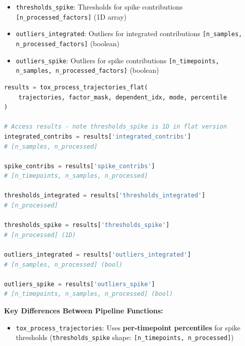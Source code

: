 \begin{enumerate}
\begin{enumerate}
\begin{itemize}
\begin{itemize}
                            \item \texttt{thresholds\_spike}: Thresholds for spike contributions
                                  \texttt{[n\_processed\_factors]} (1D array)
                                  
                            \item \texttt{outliers\_integrated}: Outliers for integrated contributions
                                  \texttt{[n\_samples, n\_processed\_factors]} (boolean)
                                  
                            \item \texttt{outliers\_spike}: Outliers for spike contributions
                                  \texttt{[n\_timepoints, n\_samples, n\_processed\_factors]} (boolean)
                          \end{itemize}
                  \end{itemize}
                  \begin{lstlisting}[language=Python, caption={Complete Trajectory Processing with Global Threshold}]
results = tox_process_trajectories_flat(
    trajectories, factor_mask, dependent_idx, mode, percentile
)

# Access results - note thresholds_spike is 1D in flat version
integrated_contribs = results['integrated_contribs']        
# [n_samples, n_processed]

spike_contribs = results['spike_contribs']                  
# [n_timepoints, n_samples, n_processed]

thresholds_integrated = results['thresholds_integrated']    
# [n_processed]

thresholds_spike = results['thresholds_spike']              
# [n_processed] (1D)

outliers_integrated = results['outliers_integrated']        
# [n_samples, n_processed] (bool)

outliers_spike = results['outliers_spike']                  
# [n_timepoints, n_samples, n_processed] (bool)
                  \end{lstlisting}
          \end{enumerate}
          
          \textbf{Key Differences Between Pipeline Functions:}
          \begin{itemize}
            \item \texttt{tox\_process\_trajectories}: Uses \textbf{per-timepoint
                  percentiles} for spike thresholds (\texttt{thresholds\_spike} shape: \texttt{[n\_timepoints,
                  n\_processed]})
            

\end{itemize}
\end{enumerate}
